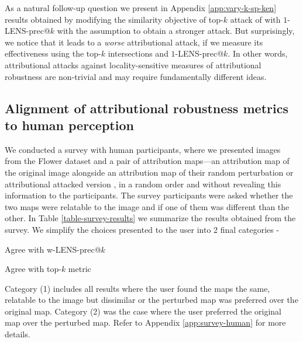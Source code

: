 \documentclass[letterpaper]{article} %
\begin{document}
As a natural follow-up question we present in Appendix \ref{app:vary-k-sp-ken} results obtained by modifying the similarity objective of top-$k$ attack of \citet{ghorbani2018interpretation} with $1$-LENS-prec@$k$ with the assumption to obtain a stronger attack. But surprisingly, we notice that it leads to a \emph{worse} attributional attack, if we measure its effectiveness using the top-$k$ intersections and $1$-LENS-prec@$k$. In other words, attributional attacks against locality-sensitive measures of attributional robustness are non-trivial and may require fundamentally different ideas.

\subsection{Alignment of attributional robustness metrics to human perception}
\label{subsec:survey-human}

We conducted a survey with human participants, where we presented images from the Flower dataset and a pair of attribution maps---an attribution map of the original image alongside an attribution map of their random perturbation or attributional attacked version \citet{ghorbani2018interpretation}, in a random order and without revealing this information to the participants. The survey participants were asked whether the two maps were relatable to the image and if one of them was different than the other. In Table \ref{table-survey-results} we summarize the results obtained from the survey. We simplify the choices presented to the user into 2 final categories - \begin{inparaenum}[(1)] \item Agree with w-LENS-prec@$k$ \item Agree with top-$k$ metric \end{inparaenum} Category (1) includes all results where the user found the maps the same, relatable to the image but dissimilar or the perturbed map was preferred over the original map. Category (2) was the case where the user preferred the original map over the perturbed map. Refer to Appendix \ref{app:survey-human} for more details.

\begin{table}[!ht]
\begin{center}
\end{center}
\caption{Survey results based on humans ability to relate the explanation map to the original image with or without noise using the Flower dataset.}
\label{table-survey-results}
\end{table}
\end{document}
